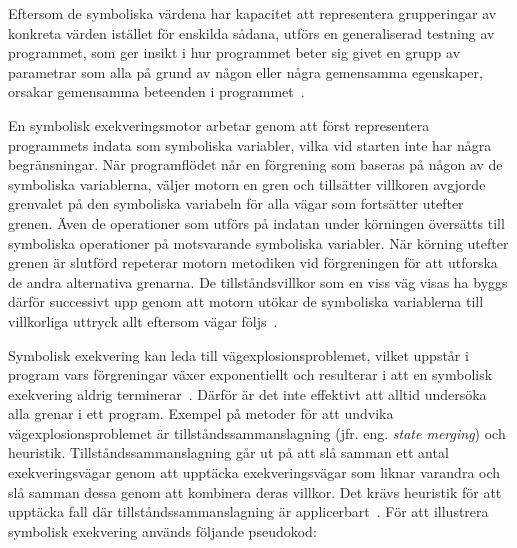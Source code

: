 Eftersom de symboliska värdena har kapacitet att representera grupperingar av konkreta
värden istället för enskilda sådana, utförs en generaliserad testning av programmet,
som ger insikt i hur programmet beter sig givet en grupp av parametrar som alla
på grund av någon eller några gemensamma egenskaper, orsakar gemensamma beteenden
i programmet~\cite{Cadar}.

En symbolisk exekveringsmotor arbetar genom att först representera programmets
indata som symboliska variabler, vilka vid starten inte har några begränsningar.
När programflödet når en förgrening som baseras på någon av de symboliska
variablerna, väljer motorn en gren och tillsätter villkoren avgjorde grenvalet på den
symboliska variabeln för alla vägar som fortsätter utefter grenen. Även de operationer
som utförs på indatan under körningen översätts till symboliska operationer på
motsvarande symboliska variabler. När körning utefter grenen är
slutförd repeterar motorn metodiken vid förgreningen för att utforska de andra
alternativa grenarna. De tillståndsvillkor som en viss väg visas ha byggs därför
successivt upp genom att motorn utökar de symboliska variablerna till
villkorliga uttryck allt eftersom vägar följs~\cite{klee}.

Symbolisk exekvering kan leda till vägexplosionsproblemet, vilket
uppstår i program vars förgreningar växer exponentiellt och resulterar i att en
symbolisk exekvering aldrig terminerar~\cite{path_explo}. Därför är det inte effektivt
att alltid undersöka alla grenar i ett program. Exempel på metoder för att
undvika vägexplosionsproblemet är tillståndssammanslagning (jfr. eng. \emph{state merging}) och heuristik.
Tillståndssammanslagning går ut på att slå samman ett antal
exekveringsvägar genom att upptäcka exekveringsvägar som liknar varandra och
slå samman dessa genom att kombinera deras villkor. Det krävs heuristik för att
upptäcka fall där tillståndssammanslagning är applicerbart~\cite{survey_symb_exc}.
För att illustrera symbolisk exekvering används följande pseudokod:

